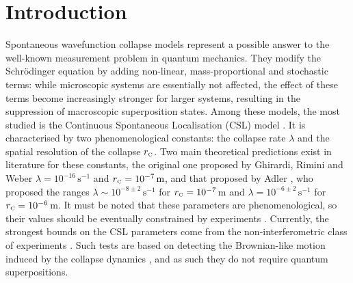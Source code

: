 \documentclass[aps,twocolumn,pra,superscriptaddress]{revtex4-2}
\newcommand\rC{r_\text{\tiny C}}
\begin{document}
\section{Introduction}
 

Spontaneous wavefunction collapse models \cite{bassi2003dynamical,bassi2013models,carlesso2022present} represent a possible answer to the well-known  measurement problem in quantum mechanics.
They modify the Schr\"odinger equation by adding non-linear, {mass-proportional} and stochastic terms: while microscopic systems are essentially not affected, the effect of these {terms}  become increasingly stronger for larger systems, {resulting} in the suppression of macroscopic superposition states.
Among these models, the most studied is the Continuous Spontaneous Localisation (CSL) model \cite{ghirardi1990markov,pearle1976reduction,pearle1989combining}. It is characterised by two phenomenological constants: the collapse rate $\lambda$ and the spatial resolution of the collapse $\rC$.
Two main theoretical predictions  {exist} in literature for these constants, the {original}  one {proposed by Ghirardi, Rimini and Weber \cite{ghirardi1986unified}}
$\lambda=10^{-16}\,\mathrm{s^{-1}}$ and $\rC=10^{-7}\,\mathrm{m}$, 
and that proposed by Adler \cite{adler2007lower}, who proposed the ranges $\lambda\sim10^{-8\pm 2}\,\mathrm{s^{-1}} $ for $\rC=10^{-7}$\,m and $\lambda=10^{-6\pm 2}\,\mathrm{s^{-1}} $ for $\rC=10^{-6}$\,m.
{It must be noted  that these parameters are phenomenological, so their values should be eventually constrained by experiments}
\cite{carlesso2022present}. Currently, the strongest bounds on the CSL parameters come from the non-interferometric class of experiments \cite{bahrami2014proposal,nimmrichter2014optomechanical,diosi2015testing, carlesso2022present}. {Such tests are based on detecting the Brownian-like motion induced by the collapse dynamics \cite{donadi2023collapse}, and as such they do not require quantum superpositions.}
\end{document}
